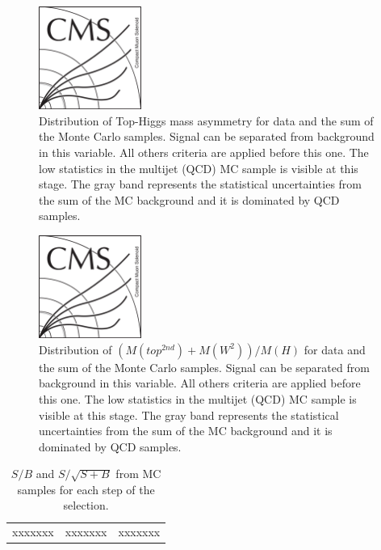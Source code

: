 \begin{figure}[!Hhtbp]
  \begin{center}
    \includegraphics[width=0.3\textwidth]{figs/CMSlogo.png}
    \caption{Distribution of Top-Higgs mass asymmetry for data and the sum of the Monte Carlo samples. Signal can be separated from background in this variable. All others criteria are applied before this one. The low statistics in the multijet (QCD) MC sample is visible at this stage. The gray band represents the statistical uncertainties from the sum of the MC background and it is dominated by QCD samples.}
    \label{fig:mthasym}
  \end{center}
\end{figure}\clearpage

\begin{figure}[!Hhtbp]
  \begin{center}
    \includegraphics[width=0.3\textwidth]{figs/CMSlogo.png}
    \caption{Distribution of $(M(top^{2nd})+M(W^{2}))/M(H)$ 
      for data and the sum of the Monte Carlo samples. Signal
      can be separated from background in this variable. All
      others criteria are applied before this one. The low statistics
      in the multijet (QCD) MC sample is visible at this
      stage. The gray band represents the statistical uncertainties
      from the sum of the MC background and it is dominated by QCD
      samples.}
    \label{fig:m2thp}
  \end{center}
\end{figure}\clearpage

\begin{table}[htbH]
\label{tab:Estimators}
\begin{center}
\begin{tabular}{|c|c|c|}
xxxxxxx & xxxxxxx & xxxxxxx
\end{tabular}
\caption{$S/B$ and $S/\sqrt{S+B}$ from MC samples for each step of the selection.}
\end{center}
\end{table}\clearpage

